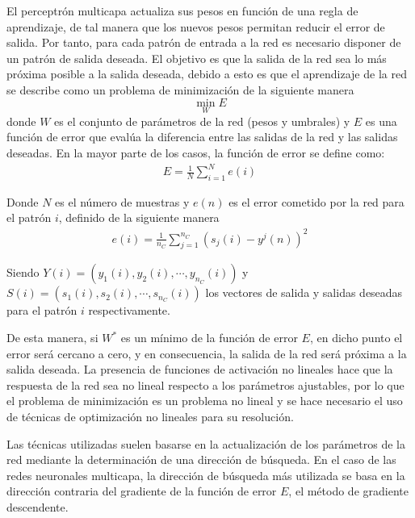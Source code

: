 El perceptrón multicapa actualiza sus pesos en función de una regla de aprendizaje, de tal manera que los nuevos pesos permitan reducir el error de salida. Por tanto, para cada patrón de entrada a la red es necesario disponer de un patrón de salida deseada. El objetivo es que la salida de la red sea lo más próxima posible a la salida deseada, debido a esto es que el aprendizaje de la red se describe como un problema de minimización de la siguiente manera $$ \min_{W} E $$ donde $W$ es el conjunto de parámetros de la red (pesos y umbrales) y $E$ es una función de error que evalúa la diferencia entre las salidas de la red y las salidas deseadas. En la mayor parte de los casos, la función de error se define como:
\begin{eqnarray}
	E = \frac{1}{N}\sum^{N}_{i = 1} e(i)
\end{eqnarray}

Donde $N$ es el número de muestras y $e(n)$ es el error cometido por la red para el patrón $i$, definido de la siguiente manera
\begin{eqnarray}
	e(i) = \frac{1}{n_{C}}\sum^{n_{C}}_{j = 1} (s_{j}(i) - y^{j}(n))^2\label{eq:error_patron}
\end{eqnarray}

Siendo $Y(i) = (y_{1}(i), y_{2}(i), \cdots, y_{n_{C}}(i))$ y $S(i) = (s_{1}(i), s_{2}(i), \cdots, s_{n_{C}}(i))$ los vectores de salida y salidas deseadas para el patrón $i$ respectivamente.

De esta manera, si $W^{*}$ es un mínimo de la función de error $E$, en dicho punto el error será cercano a cero, y en consecuencia, la salida de la red será próxima a la salida deseada. La presencia de funciones de activación no lineales hace que la respuesta de la red sea no lineal respecto a los parámetros ajustables, por lo que el problema de minimización es un problema no lineal y se hace necesario el uso de técnicas de optimización no lineales para su resolución.

Las técnicas utilizadas suelen basarse en la actualización de los parámetros de la red mediante la determinación de una dirección de búsqueda. En el caso de las redes neuronales multicapa, la dirección de búsqueda más utilizada se basa en la dirección contraria del gradiente de la función de error $E$, el método de gradiente descendente.

